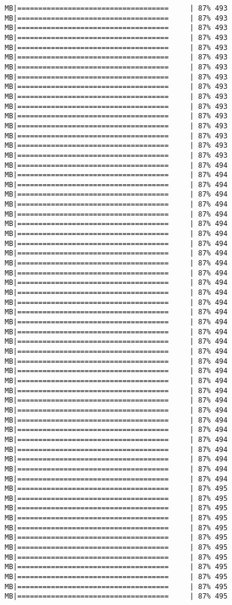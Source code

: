 \documentclass[
]{article}
\begin{document}
\begin{verbatim}
MB|====================================     | 87% 493 MB|====================================     | 87% 493 MB|====================================     | 87% 493 MB|====================================     | 87% 493 MB|====================================     | 87% 493 MB|====================================     | 87% 493 MB|====================================     | 87% 493 MB|====================================     | 87% 493 MB|====================================     | 87% 493 MB|====================================     | 87% 493 MB|====================================     | 87% 493 MB|====================================     | 87% 493 MB|====================================     | 87% 493 MB|====================================     | 87% 493 MB|====================================     | 87% 493 MB|====================================     | 87% 493 MB|====================================     | 87% 494 MB|====================================     | 87% 494 MB|====================================     | 87% 494 MB|====================================     | 87% 494 MB|====================================     | 87% 494 MB|====================================     | 87% 494 MB|====================================     | 87% 494 MB|====================================     | 87% 494 MB|====================================     | 87% 494 MB|====================================     | 87% 494 MB|====================================     | 87% 494 MB|====================================     | 87% 494 MB|====================================     | 87% 494 MB|====================================     | 87% 494 MB|====================================     | 87% 494 MB|====================================     | 87% 494 MB|====================================     | 87% 494 MB|====================================     | 87% 494 MB|====================================     | 87% 494 MB|====================================     | 87% 494 MB|====================================     | 87% 494 MB|====================================     | 87% 494 MB|====================================     | 87% 494 MB|====================================     | 87% 494 MB|====================================     | 87% 494 MB|====================================     | 87% 494 MB|====================================     | 87% 494 MB|====================================     | 87% 494 MB|====================================     | 87% 494 MB|====================================     | 87% 494 MB|====================================     | 87% 494 MB|====================================     | 87% 494 MB|====================================     | 87% 494 MB|====================================     | 87% 495 MB|====================================     | 87% 495 MB|====================================     | 87% 495 MB|====================================     | 87% 495 MB|====================================     | 87% 495 MB|====================================     | 87% 495 MB|====================================     | 87% 495 MB|====================================     | 87% 495 MB|====================================     | 87% 495 MB|====================================     | 87% 495 MB|====================================     | 87% 495 MB|====================================     | 87% 495 
\end{verbatim}
\end{document}
